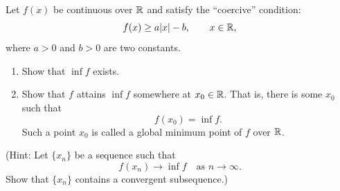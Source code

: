 \begingroup
\renewcommand{\labelenumi}{(\alph{enumi})}
\begin{exercise}
  \label{ex:hw05:coercive-minimum}
  Let $f(x)$ be continuous over $\mathbb{R}$ and satisfy the ``coercive''
  condition:
  \[
    f(x)\ge a|x|-b,\qquad x\in\mathbb{R},
  \]
  where $a>0$ and $b>0$ are two constants.
  \begin{enumerate}
    \item Show that $\inf f$ exists.
    \item Show that $f$ attains $\inf f$ somewhere at $x_0\in\mathbb{R}$.
      That is, there is some $x_0$ such that
      \[
        f(x_0)=\inf f.
      \]
      Such a point $x_0$ is called a global minimum point of $f$ over $\mathbb{R}$.
  \end{enumerate}
  (Hint: Let $\{x_n\}$ be a sequence such that
  \[
    f(x_n)\to\inf f\quad\text{as }n\to\infty.
  \]
  Show that $\{x_n\}$ contains a convergent subsequence.)
\end{exercise}
\endgroup
